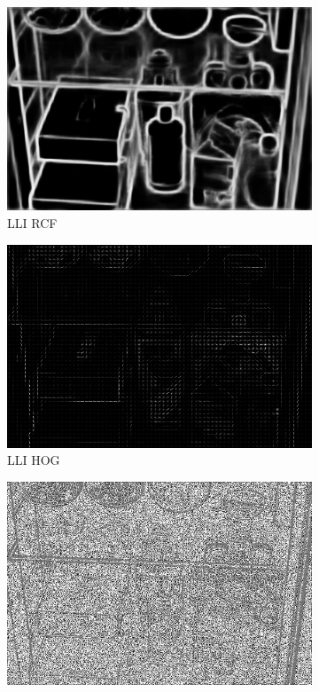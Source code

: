 \documentclass[a4paper]{ctexart}
\begin{document}
\begin{figure}[htb]
\begin{subfigure}{0.19\textwidth}
			\includegraphics[width=\linewidth]{picture/LLIE/My Architecture/Edge Detection/low00044_rcf}
			\captionsetup{font=scriptsize}
			\caption{LLI RCF}
			\label{fig: LLI_rcf}
		\end{subfigure}
		\begin{subfigure}{0.19\textwidth}
			\includegraphics[width=\linewidth]{picture/LLIE/My Architecture/Edge Detection/low00044_hog}
			\captionsetup{font=scriptsize}
			\caption{LLI HOG}
			\label{fig: LLI_hog}
		\end{subfigure}
		\begin{subfigure}{0.19\textwidth}
			\includegraphics[width=\linewidth]{picture/LLIE/My Architecture/Edge Detection/low00044_lbp}

\end{subfigure}
\end{figure}
\end{document}
